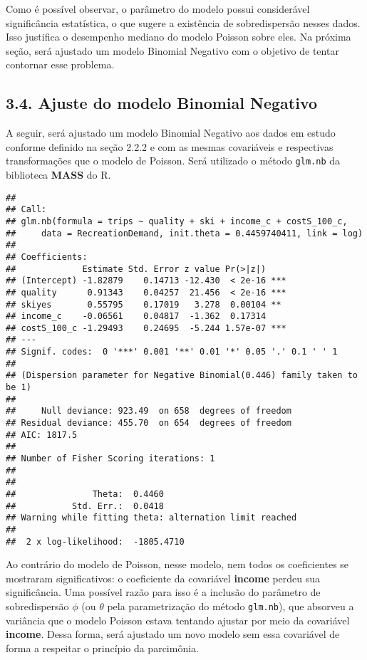 \documentclass[
]{article}
\begin{document}
Como é possível observar, o parâmetro do modelo possui considerável
significância estatística, o que sugere a existência de sobredispersão
nesses dados. Isso justifica o desempenho mediano do modelo Poisson
sobre eles. Na próxima seção, será ajustado um modelo Binomial Negativo
com o objetivo de tentar contornar esse problema.

\subsection{3.4. Ajuste do modelo Binomial
Negativo}\label{ajuste-do-modelo-binomial-negativo}

A seguir, será ajustado um modelo Binomial Negativo aos dados em estudo
conforme definido na seção 2.2.2 e com as mesmas covariáveis e
respectivas transformações que o modelo de Poisson. Será utilizado o
método \texttt{glm.nb} da biblioteca \textbf{MASS} do R.

\begin{verbatim}
## 
## Call:
## glm.nb(formula = trips ~ quality + ski + income_c + costS_100_c, 
##     data = RecreationDemand, init.theta = 0.4459740411, link = log)
## 
## Coefficients:
##             Estimate Std. Error z value Pr(>|z|)    
## (Intercept) -1.82879    0.14713 -12.430  < 2e-16 ***
## quality      0.91343    0.04257  21.456  < 2e-16 ***
## skiyes       0.55795    0.17019   3.278  0.00104 ** 
## income_c    -0.06561    0.04817  -1.362  0.17314    
## costS_100_c -1.29493    0.24695  -5.244 1.57e-07 ***
## ---
## Signif. codes:  0 '***' 0.001 '**' 0.01 '*' 0.05 '.' 0.1 ' ' 1
## 
## (Dispersion parameter for Negative Binomial(0.446) family taken to be 1)
## 
##     Null deviance: 923.49  on 658  degrees of freedom
## Residual deviance: 455.70  on 654  degrees of freedom
## AIC: 1817.5
## 
## Number of Fisher Scoring iterations: 1
## 
## 
##               Theta:  0.4460 
##           Std. Err.:  0.0418 
## Warning while fitting theta: alternation limit reached 
## 
##  2 x log-likelihood:  -1805.4710
\end{verbatim}

Ao contrário do modelo de Poisson, nesse modelo, nem todos os
coeficientes se mostraram significativos: o coeficiente da covariável
\textbf{income} perdeu sua significância. Uma possível razão para isso é
a inclusão do parâmetro de sobredispersão \(\phi\) (ou \(\theta\) pela
parametrização do método \texttt{glm.nb}), que absorveu a variância que
o modelo Poisson estava tentando ajustar por meio da covariável
\textbf{income}. Dessa forma, será ajustado um novo modelo sem essa
covariável de forma a respeitar o princípio da parcimônia.
\end{document}
